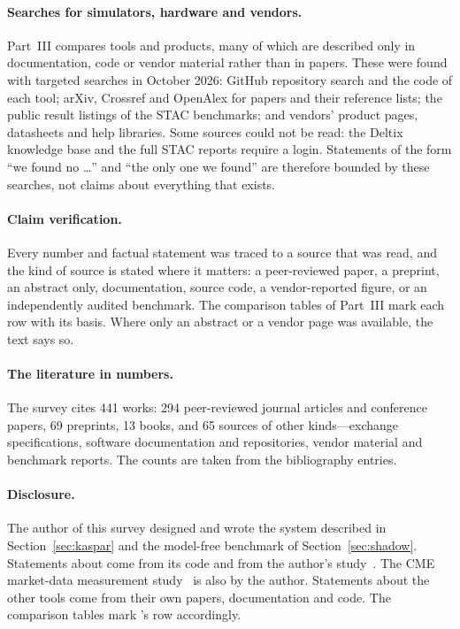 \paragraph{Searches for simulators, hardware and vendors.} Part~III compares tools and products, many of which are
described only in documentation, code or vendor material rather than in papers. These were found with targeted
searches in October 2026: GitHub repository search and the code of each tool; arXiv, Crossref and OpenAlex for papers
and their reference lists; the public result listings of the STAC benchmarks; and vendors' product pages, datasheets
and help libraries. Some sources could not be read: the Deltix knowledge base and the full STAC reports require a
login. Statements of the form ``we found no \ldots'' and ``the only one we found'' are therefore bounded
by these searches, not claims about everything that exists.

\paragraph{Claim verification.} Every number and factual statement was traced to a source that was read, and
the kind of source is stated where it matters: a peer-reviewed paper, a preprint, an abstract only, documentation,
source code, a vendor-reported figure, or an independently audited benchmark. The comparison tables of Part~III mark each row
with its basis. Where only an abstract or a vendor page was available, the text says so.

\paragraph{The literature in numbers.} The survey cites 441 works: 294 peer-reviewed journal articles and
conference papers, 69 preprints, 13 books, and 65 sources of other kinds---exchange
specifications, software documentation and repositories, vendor material and benchmark reports. The counts are taken
from the bibliography entries.

\paragraph{Disclosure.} The author of this survey designed and wrote the \kasparhft{} system described in
Section~\ref{sec:kaspar} and the model-free benchmark of Section~\ref{sec:shadow}. Statements about \kasparhft{} come from
its code and from the author's study~\citep{maciejewski_shadow}. The CME market-data measurement
study~\citep{maciejewski2026packets} is also by the author. Statements about the other tools come from
their own papers, documentation and code. The comparison tables mark \kasparhft{}'s row accordingly.

